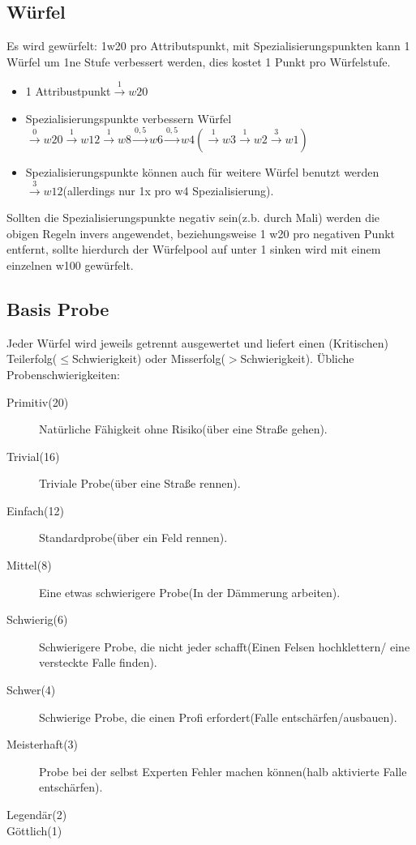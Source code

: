 \subsection{Würfel}

Es wird gewürfelt: 1w20 pro Attributspunkt, mit Spezialisierungspunkten kann 1 Würfel um 1ne Stufe verbessert werden, dies kostet 1 Punkt pro Würfelstufe.

\begin{itemize}
\item 1 Attribustpunkt$\xrightarrow{1}w20$
\item Spezialisierungspunkte verbessern Würfel $\xrightarrow{0}w20\xrightarrow{1}w12\xrightarrow{1}w8\xrightarrow{0,5}w6\xrightarrow{0,5}w4(\xrightarrow{1}w3\xrightarrow{1}w2\xrightarrow{3}w1)$
\item Spezialisierungspunkte können auch für weitere Würfel benutzt werden $\xrightarrow{3}w12$(allerdings nur 1x pro w4 Spezialisierung).
\end{itemize}

Sollten die Spezialisierungspunkte negativ sein(z.b. durch Mali) werden die obigen Regeln invers angewendet, beziehungsweise 1 w20 pro negativen Punkt entfernt, sollte hierdurch der Würfelpool auf unter 1 sinken wird mit einem einzelnen w100 gewürfelt.

\subsection{Basis Probe}

Jeder Würfel wird jeweils getrennt ausgewertet und liefert einen (Kritischen) Teilerfolg($\leq$Schwierigkeit) oder Misserfolg($>$Schwierigkeit). Übliche Probenschwierigkeiten:
\begin{description}
\item[Primitiv(20)] Natürliche Fähigkeit ohne Risiko(über eine Straße gehen).
\item[Trivial(16)] Triviale Probe(über eine Straße rennen).
\item[Einfach(12)] Standardprobe(über ein Feld rennen).
\item[Mittel(8)] Eine etwas schwierigere Probe(In der Dämmerung arbeiten).
\item[Schwierig(6)] Schwierigere Probe, die nicht jeder schafft(Einen Felsen hochklettern/ eine versteckte Falle finden).
\item[Schwer(4)] Schwierige Probe, die einen Profi erfordert(Falle entschärfen/ausbauen).
\item[Meisterhaft(3)] Probe bei der selbst Experten Fehler machen können(halb aktivierte Falle entschärfen).
\item[Legendär(2)] 
\item[Göttlich(1)] 
\end{description}

